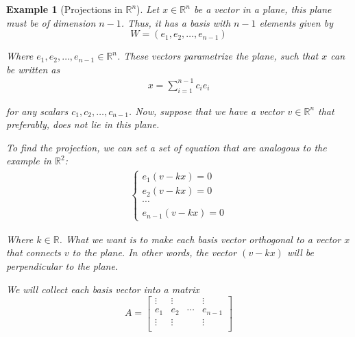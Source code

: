 \documentclass{book}
\newtheorem{example}{Example}[chapter]
\begin{document}
\begin{example}[Projections in $\mathbb{R}^{n}$]
    Let $x\in\mathbb{R}^{n}$ be a vector in a plane, this plane must be of dimension $n-1$.
    Thus, it has a basis with $n-1$ elements given by
    \begin{equation*}
        W = \left(e_1, e_2,\dots, e_{n-1}\right)
    \end{equation*}

    Where $e_1,e_2,\dots,e_{n-1}\in\mathbb{R}^{n}$. These vectors parametrize the
    plane, such that $x$ can be written as
    \begin{equation}
        \begin{split}
            x = \sum_{i=1}^{n-1}{c_i e_i}
        \end{split}
    \end{equation}

    for any scalars $c_1,c_2,\dots,c_{n-1}$. Now, suppose that we have a vector
    $v\in\mathbb{R}^{n}$ that preferably, does not lie in this plane.

    To find the projection, we can set a set of equation that are analogous to the
    example in $\mathbb{R}^{2}$:
    \begin{equation}
        \begin{split}
            \begin{cases}
                e_1(v - k x) = 0 \\
                e_2(v - k x) = 0 \\
                \cdots           \\
                e_{n-1}(v - k x) = 0
            \end{cases}
        \end{split}
    \end{equation}

    Where $k\in\mathbb{R}$. What we want is to make each basis vector orthogonal to
    a vector $x$ that connects $v$ to the plane. In other words, the vector
    $(v-kx)$ will be perpendicular to the plane.

    We will collect each basis vector into a matrix
    \begin{equation}
        A = \left[
            \begin{matrix}
                \vdots & \vdots &        & \vdots  \\
                e_1    & e_2    & \cdots & e_{n-1} \\
                \vdots & \vdots &        & \vdots  \\
            \end{matrix}
            \right]
    \end{equation}


\end{example}
\end{document}
